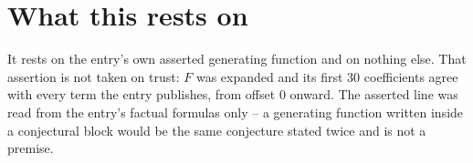 \documentclass[11pt,a4paper]{article}
\theoremstyle{plain}
\theoremstyle{definition}
\begin{document}
\section{What this rests on}

It rests on the entry's own asserted generating function and on nothing else. That assertion is
not taken on trust: $F$ was expanded and its first 30 coefficients agree with every
term the entry publishes, from offset $0$ onward. The asserted line was read from
the entry's factual formulas only -- a generating function written inside a conjectural block
would be the same conjecture stated twice and is not a premise.
\end{document}
